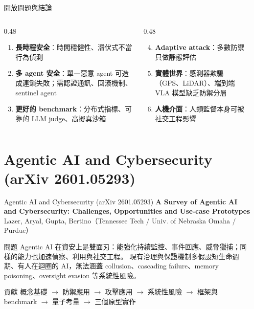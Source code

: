 \documentclass[aspectratio=169]{beamer}
\begin{document}
\begin{frame}{開放問題與結論}
    \footnotesize
    \begin{columns}[T]
        \begin{column}{0.48\textwidth}
            \begin{enumerate}
                \item \textbf{長時程安全}：時間穩健性、潛伏式不當行為偵測
                \item \textbf{多 agent 安全}：單一惡意 agent 可造成連鎖失敗；需認證通訊、回滾機制、sentinel agent
                \item \textbf{更好的 benchmark}：分布式指標、可靠的 LLM judge、高擬真沙箱
            \end{enumerate}
        \end{column}
        \begin{column}{0.48\textwidth}
            \begin{enumerate}
                \setcounter{enumi}{3}
                \item \textbf{Adaptive attack}：多數防禦只做靜態評估
                \item \textbf{實體世界}：感測器欺騙（GPS、LiDAR）、端到端 VLA 模型缺乏防禦分層
                \item \textbf{人機介面}：人類監督本身可被社交工程影響
            \end{enumerate}
        \end{column}
    \end{columns}
\end{frame}


\section{Agentic AI and Cybersecurity (arXiv 2601.05293)}

\begin{frame}{Agentic AI and Cybersecurity (arXiv 2601.05293)}
    \small
    \textbf{A Survey of Agentic AI and Cybersecurity: Challenges, Opportunities and Use-case Prototypes}\\
    Lazer, Aryal, Gupta, Bertino（Tennessee Tech / Univ. of Nebraska Omaha / Purdue）

    \medskip

    \begin{block}{問題}
        Agentic AI 在資安上是\alert{雙面刃}：能強化持續監控、事件回應、威脅獵捕；同樣的能力也加速偵察、利用與社交工程。
        現有治理與保證機制多假設短生命週期、有人在迴圈的 AI，無法涵蓋 collusion、cascading failure、memory poisoning、oversight evasion 等系統性風險。
    \end{block}

    \begin{block}{貢獻}
        概念基礎 $\rightarrow$ 防禦應用 $\rightarrow$ 攻擊應用 $\rightarrow$ 系統性風險 $\rightarrow$ 框架與 benchmark $\rightarrow$ 量子考量 $\rightarrow$ 三個原型實作
    \end{block}
\end{frame}
\end{document}

